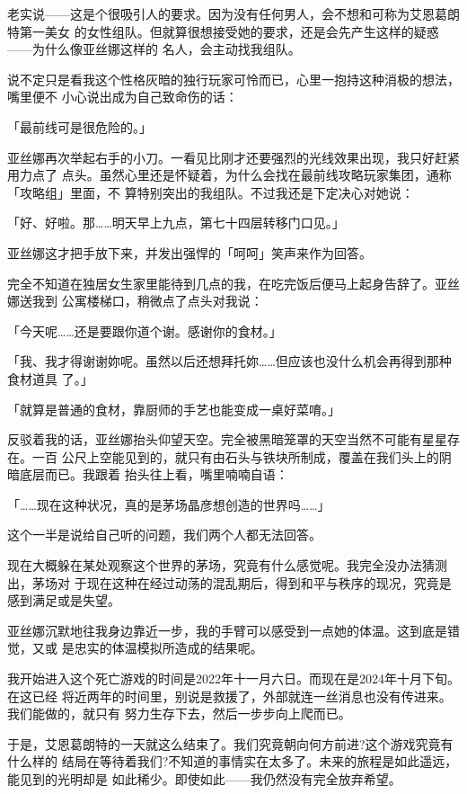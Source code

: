 \documentclass[11pt]{book}
\begin{document}
老实说——这是个很吸引人的要求。因为没有任何男人，会不想和可称为艾恩葛朗特第一美女
的女性组队。但就算很想接受她的要求，还是会先产生这样的疑惑——为什么像亚丝娜这样的
名人，会主动找我组队。

说不定只是看我这个性格灰暗的独行玩家可怜而已，心里一抱持这种消极的想法，嘴里便不
小心说出成为自己致命伤的话：

「最前线可是很危险的。」

亚丝娜再次举起右手的小刀。一看见比刚才还要强烈的光线效果出现，我只好赶紧用力点了
点头。虽然心里还是怀疑着，为什么会找在最前线攻略玩家集团，通称「攻略组」里面，不
算特别突出的我组队。不过我还是下定决心对她说：

「好、好啦。那……明天早上九点，第七十四层转移门口见。」

亚丝娜这才把手放下来，并发出强悍的「呵呵」笑声来作为回答。

完全不知道在独居女生家里能待到几点的我，在吃完饭后便马上起身告辞了。亚丝娜送我到
公寓楼梯口，稍微点了点头对我说：

「今天呢……还是要跟你道个谢。感谢你的食材。」

「我、我才得谢谢妳呢。虽然以后还想拜托妳……但应该也没什么机会再得到那种食材道具
了。」

「就算是普通的食材，靠厨师的手艺也能变成一桌好菜唷。」

反驳着我的话，亚丝娜抬头仰望天空。完全被黑暗笼罩的天空当然不可能有星星存在。一百
公尺上空能见到的，就只有由石头与铁块所制成，覆盖在我们头上的阴暗底层而已。我跟着
抬头往上看，嘴里喃喃自语：

「……现在这种状况，真的是茅场晶彦想创造的世界吗……」

这个一半是说给自己听的问题，我们两个人都无法回答。

现在大概躲在某处观察这个世界的茅场，究竟有什么感觉呢。我完全没办法猜测出，茅场对
于现在这种在经过动荡的混乱期后，得到和平与秩序的现况，究竟是感到满足或是失望。

亚丝娜沉默地往我身边靠近一步，我的手臂可以感受到一点她的体温。这到底是错觉，又或
是忠实的体温模拟所造成的结果呢。

我开始进入这个死亡游戏的时间是2022年十一月六日。而现在是2024年十月下旬。在这已经
将近两年的时间里，别说是救援了，外部就连一丝消息也没有传进来。我们能做的，就只有
努力生存下去，然后一步步向上爬而已。

于是，艾恩葛朗特的一天就这么结束了。我们究竟朝向何方前进?这个游戏究竟有什么样的
结局在等待着我们?不知道的事情实在太多了。未来的旅程是如此遥远，能见到的光明却是
如此稀少。即使如此——我仍然没有完全放弃希望。
\end{document}

